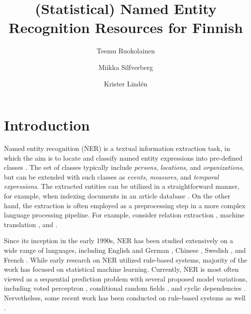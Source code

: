 \documentclass[11pt]{article}
\begin{document}
\title{(Statistical) Named Entity Recognition Resources for Finnish}
\author{Teemu Ruokolainen \and Miikka Silfverberg \and Krister Lind\'en}



\maketitle


\begin{abstract}
\noindent 

\end{abstract}

\section{Introduction}
\label{sec: introduction}

Named entity recognition (NER) is a textual information extraction task, in which the aim is to locate and classify named entity expressions into pre-defined classes \citep{nadeau2007}. The set of classes typically include \textit{persons}, \textit{locations}, and \textit{organizations}, but can be extended with such classes as \textit{events}, \textit{measures}, and \textit{temporal expressions}. The extracted entities can be utilized in a straightforward manner, for example, when indexing documents in an article database \citep{}. On the other hand, the extraction is often employed as a preprocessing step in a more complex language processing pipeline. For example, consider relation extraction \citep{}, machine translation \citep{}, and \citep{}.

Since its inception in the early 1990s, NER has been studied extensively on a wide range of languages, including English and German \citep{tjong2003}, Chinese \citep{bai2001}, Swedish \citep{dalianis2001}, and French \citep{petasis2001,poibeau2003}. While early research on NER utilized rule-based systems, majority of the work has focused on statistical machine learning. Currently, NER is most often viewed as a sequential prediction problem with several proposed model variations, including voted perceptron \citep{}, conditional random fields \citep{}, and cyclic dependencies \citep{}. Nervetheless, some recent work has been conducted on rule-based systems as well \citep{}. 

\end{document}
